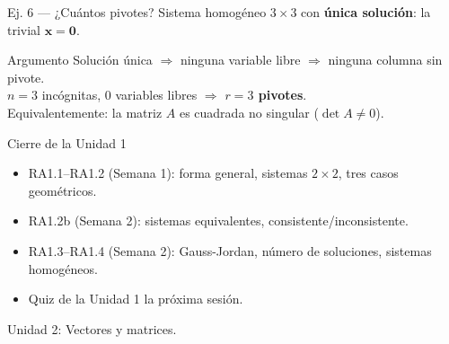 \documentclass[11pt]{beamer}
\newcommand{\vv}[1]{\mathbf{#1}}
\begin{document}
\begin{frame}{Ej. 6 — ¿Cuántos pivotes?}
  Sistema homogéneo $3\times 3$ con \textbf{única solución}: la trivial $\vv{x}=\vv{0}$.
  \vfill
  \begin{block}{Argumento}
    Solución única $\Rightarrow$ ninguna variable libre $\Rightarrow$ ninguna columna sin
    pivote.\\
    $n=3$ incógnitas, 0 variables libres $\Rightarrow$ \textbf{$r=3$ pivotes}.\\
    Equivalentemente: la matriz $A$ es cuadrada no singular ($\det A\neq 0$).
  \end{block}
\end{frame}

\begin{frame}{Cierre de la Unidad 1}
  \begin{itemize}
    \item RA1.1--RA1.2 (Semana 1): forma general, sistemas $2\times 2$, tres casos geométricos.
    \item RA1.2b (Semana 2): sistemas equivalentes, consistente/inconsistente.
    \item RA1.3--RA1.4 (Semana 2): Gauss-Jordan, número de soluciones, sistemas homogéneos.
    \item Quiz de la Unidad 1 la próxima sesión.
  \end{itemize}
  \vfill
  \centering \Large Unidad 2: Vectores y matrices.
\end{frame}
\end{document}
